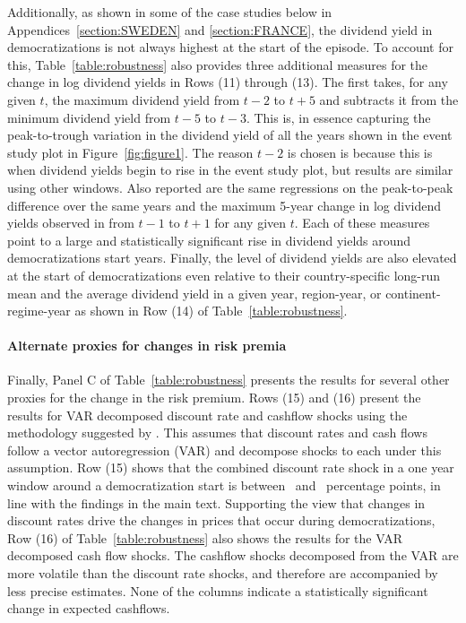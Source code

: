 \documentclass[12pt]{article}
\numberwithin{equation}{section}
\begin{document}
Additionally, as shown in some of the case studies below in Appendices~\ref{section:SWEDEN} and \ref{section:FRANCE}, the dividend yield in democratizations is not always highest at the start of the episode. To account for this, Table~\ref{table:robustness} also provides three additional measures for the change in log dividend yields in Rows (11) through (13). The first takes, for any given $t$, the maximum dividend yield from $t-2$ to $t+5$ and subtracts it from the minimum dividend yield from $t-5$ to $t-3$. This is, in essence capturing the peak-to-trough variation in the dividend yield of all the years shown in the event study plot in Figure~\ref{fig:figure1}.  The reason $t-2$ is chosen is because this is when dividend yields begin to rise in the event study plot, but results are similar using other windows. Also reported are the same regressions on the peak-to-peak difference over the same years and the maximum 5-year change in log dividend yields observed in from $t-1$ to $t+1$ for any given $t$. Each of these measures point to a large and statistically significant rise in dividend yields around democratizations start years.  Finally, the level of dividend yields are also elevated at the start of democratizations even relative to their country-specific long-run mean and the average dividend yield in a given year, region-year, or continent-regime-year as shown in Row (14) of Table~\ref{table:robustness}.


\paragraph{Alternate proxies for changes in risk premia}
Finally, Panel C of Table~\ref{table:robustness} presents the results for several other proxies for the change in the risk premium. Rows (15) and (16) present the results for VAR decomposed discount rate and cashflow shocks using the methodology suggested by \citep{Campbell1991}.  This assumes that discount rates and cash flows follow a vector autoregression (VAR) and decompose shocks to each under this assumption. Row (15) shows that the combined discount rate shock in a one year window around a democratization start is between \tabBThreeDRLow\ and \tabBThreeDRHigh\ percentage points, in line with the findings in the main text. Supporting the view that changes in discount rates drive the changes in prices that occur during democratizations, Row (16) of Table~\ref{table:robustness} also shows the results for the VAR decomposed cash flow shocks. The cashflow shocks decomposed from the VAR are more volatile than the discount rate shocks, and therefore are accompanied by less precise estimates. None of the columns indicate a statistically significant change in expected cashflows. 
\end{document}
